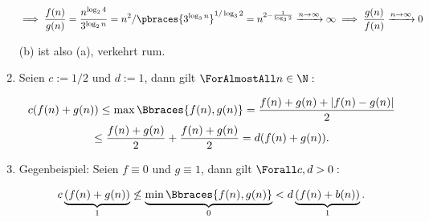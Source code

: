 \begin{solution}
\begin{enumerate}[label = (\alph*)]
  \begin{align*}
    \implies
    \frac{f(n)}{g(n)}
    =
    \frac{n^{\log_2{4}}}{3^{\log_2{n}}}
    =
    n^2 / \pbraces{3^{\log_3{n}}}^{1 / \log_3{2}}
    =
    n^{2 - \frac{1}{\log_3{2}}}
    \xrightarrow{n \to \infty} \infty
    \implies
    \frac{g(n)}{f(n)}
    \xrightarrow{n \to \infty} 0
  \end{align*}

  (b) ist also (a), verkehrt rum.
 
  \item

  \begin{comment}

    \begin{figure}[h!]
    \begin{boxedin}
      \vspace{0.5 cm}
      \hspace{0.5 cm}
      \texttt{[image: Kaltenbaeck - Fundament Analysis - Lemma 2.2.12.1.png]} \\
      \vspace{0.01 cm}
      \hspace{0.5 cm}
      \texttt{[image: Kaltenbaeck - Fundament Analysis - Lemma 2.2.12.2.png]} \\
      \vspace{0.5 cm}
      \caption{Kaltenbaeck - Fundament Analysis}
      \label{fig:KFAL2.2.12}
    \end{boxedin}
  \end{figure}

  \end{comment}

  Seien $c := 1/2$ und $d := 1$, dann gilt $\ForAlmostAll n \in \N:$

  \begin{multline*}
    c (f(n) + g(n))
    \leq
    \max \Bbraces{f(n), g(n)}
    =
    \frac{f(n) + g(n) + |f(n) - g(n)|}{2} \\
    \leq
    \frac{f(n) + g(n)}{2}
    +
    \frac{f(n) + g(n)}{2}
    =
    d (f(n) + g(n)).
  \end{multline*}

  \item Gegenbeispiel:
  Seien $f \equiv 0$ und $g \equiv 1$, dann gilt $\Forall c, d > 0:$

  \begin{align*}
    c \underbrace{(f(n) + g(n))}_1
    \not \leq
    \underbrace{\min \Bbraces{f(n), g(n)}}_0
    <
    d \underbrace{(f(n) + b(n))}_1.
  \end{align*}


\end{enumerate}
\end{solution}
